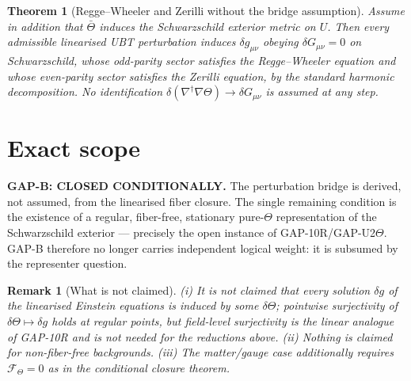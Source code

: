 \documentclass[11pt,a4paper]{article}
\newtheorem{theorem}{Theorem}
\newtheorem{remark}{Remark}
\newcommand{\F}{\mathscr F}
\begin{document}
\begin{theorem}[Regge--Wheeler and Zerilli without the bridge assumption]
Assume in addition that $\bar\Theta$ induces the Schwarzschild exterior metric
on $U$. Then every admissible linearised UBT perturbation induces
$\delta g_{\mu\nu}$ obeying $\delta G_{\mu\nu}=0$ on Schwarzschild, whose
odd-parity sector satisfies the Regge--Wheeler equation and whose even-parity
sector satisfies the Zerilli equation, by the standard harmonic decomposition.
No identification $\delta(\nabla^\dagger\nabla\Theta)\to\delta G_{\mu\nu}$ is
assumed at any step.
\end{theorem}

\section{Exact scope}
\begin{tcolorbox}[colback=yellow!6,colframe=orange!70!black,title=Status]
\textbf{GAP-B: CLOSED CONDITIONALLY.} The perturbation bridge is derived, not
assumed, from the linearised fiber closure. The single remaining condition is
the existence of a regular, fiber-free, stationary pure-$\Theta$ representation
of the Schwarzschild exterior --- precisely the open instance of
GAP-10R/GAP-U2$\Theta$. GAP-B therefore no longer carries independent logical
weight: it is subsumed by the representer question.
\end{tcolorbox}

\begin{remark}[What is not claimed]
(i) It is not claimed that every solution $\delta g$ of the linearised Einstein
equations is induced by some $\delta\Theta$; pointwise surjectivity of
$\delta\Theta\mapsto\delta g$ holds at regular points, but field-level
surjectivity is the linear analogue of GAP-10R and is not needed for the
reductions above. (ii) Nothing is claimed for non-fiber-free backgrounds.
(iii) The matter/gauge case additionally requires $\F_\Theta=0$ as in the
conditional closure theorem.
\end{remark}
\end{document}
